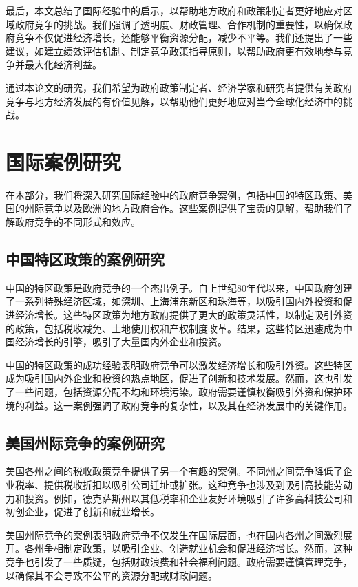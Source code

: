 \documentclass[a4paper,12pt]{ctexart}
\begin{document}
最后，本文总结了国际经验中的启示，以帮助地方政府和政策制定者更好地应对区域政府竞争的挑战。我们强调了透明度、财政管理、合作机制的重要性，以确保政府竞争不仅促进经济增长，还能够平衡资源分配，减少不平等。我们还提出了一些建议，如建立绩效评估机制、制定竞争政策指导原则，以帮助政府更有效地参与竞争并最大化经济利益。

通过本论文的研究，我们希望为政府政策制定者、经济学家和研究者提供有关政府竞争与地方经济发展的有价值见解，以帮助他们更好地应对当今全球化经济中的挑战。
\section{国际案例研究}

在本部分，我们将深入研究国际经验中的政府竞争案例，包括中国的特区政策、美国的州际竞争以及欧洲的地方政府合作。这些案例提供了宝贵的见解，帮助我们了解政府竞争的不同形式和效应。

\subsection{中国特区政策的案例研究}

中国的特区政策是政府竞争的一个杰出例子。自上世纪80年代以来，中国政府创建了一系列特殊经济区域，如深圳、上海浦东新区和珠海等，以吸引国内外投资和促进经济增长。这些特区政策为地方政府提供了更大的政策灵活性，以制定吸引外资的政策，包括税收减免、土地使用权和产权制度改革。结果，这些特区迅速成为中国经济增长的引擎，吸引了大量国内外企业和投资。

中国的特区政策的成功经验表明政府竞争可以激发经济增长和吸引外资。这些特区成为吸引国内外企业和投资的热点地区，促进了创新和技术发展。然而，这也引发了一些问题，包括资源分配不均和环境污染。政府需要谨慎权衡吸引外资和保护环境的利益。这一案例强调了政府竞争的复杂性，以及其在经济发展中的关键作用。

\subsection{美国州际竞争的案例研究}

美国各州之间的税收政策竞争提供了另一个有趣的案例。不同州之间竞争降低了企业税率、提供税收折扣以吸引公司迁址或扩张。这种竞争也涉及到吸引高技能劳动力和投资。例如，德克萨斯州以其低税率和企业友好环境吸引了许多高科技公司和初创企业，促进了创新和就业增长。

美国州际竞争的案例表明政府竞争不仅发生在国际层面，也在国内各州之间激烈展开。各州争相制定政策，以吸引企业、创造就业机会和促进经济增长。然而，这种竞争也引发了一些质疑，包括财政浪费和社会福利问题。政府需要谨慎管理竞争，以确保其不会导致不公平的资源分配或财政问题。
\end{document}
